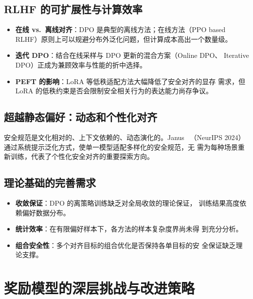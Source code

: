 \documentclass[12pt,a4paper,UTF8]{ctexart}
\begin{document}
\subsection{RLHF 的可扩展性与计算效率}

\begin{itemize}[leftmargin=2em]
  \item \textbf{在线 vs.\ 离线对齐}：DPO 是典型的离线方法；在线方法（PPO
    based RLHF）原则上可以规避分布外泛化问题，但计算成本高出一个数量级。
  \item \textbf{迭代 DPO}：结合在线采样与 DPO 更新的混合方案（Online DPO、
    Iterative DPO）正成为兼顾效率与性能的折中选择。
  \item \textbf{PEFT 的影响}：LoRA 等低秩适配方法大幅降低了安全对齐的显存
    需求，但 LoRA 的低秩约束是否会限制安全相关行为的表达能力尚存争议。
\end{itemize}

\subsection{超越静态偏好：动态和个性化对齐}

安全规范是文化相对的、上下文依赖的、动态演化的。Janus~\cite{janus2024}
（NeurIPS 2024）通过系统提示泛化方式，使单一模型适配多样化的安全规范，无
需为每种场景重新训练，代表了个性化安全对齐的重要探索方向。

\subsection{理论基础的完善需求}

\begin{itemize}[leftmargin=2em]
  \item \textbf{收敛保证}：DPO 的离策略训练缺乏对全局收敛的理论保证，
    训练结果高度依赖偏好数据分布。
  \item \textbf{统计效率}：在有限偏好样本下，各方法的样本复杂度界尚未得
    到充分分析。
  \item \textbf{组合安全性}：多个对齐目标的组合优化是否保持各单目标的安
    全保证缺乏理论支撑。
\end{itemize}

\section{奖励模型的深层挑战与改进策略}
\label{sec:rm_challenge}
\end{document}
